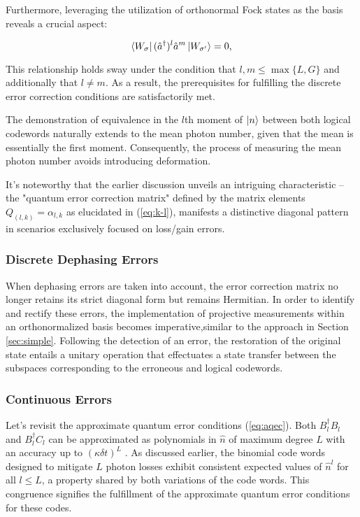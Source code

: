 \documentclass[11pt]{article}
\newcommand\0{\mathbf{0}}
\newcommand\<{\langle}
\renewcommand\>{\rangle}
\begin{document}
Furthermore, leveraging the utilization of orthonormal Fock states as the basis reveals a crucial aspect:

\[
\bra{W_\sigma}(\hat{a}^\dag)^l\hat{a}^m \ket{W_{\sigma'}} = 0,
\]

This relationship holds sway under the condition that \(l, m \leq \max\{L, G\}\) and additionally that \(l \neq m\). As a result, the prerequisites for fulfilling the discrete error correction conditions are satisfactorily met.

The demonstration of equivalence in the \(l\)th moment of \(\ket{n}\) between both logical codewords naturally extends to the mean photon number, given that the mean is essentially the first moment. Consequently, the process of measuring the mean photon number avoids introducing deformation.

It's noteworthy that the earlier discussion unveils an intriguing characteristic – the "quantum error correction matrix" defined by the matrix elements \(Q_{(l, k)} = \alpha_{l, k}\) as elucidated in (\ref{eq:k-l}), manifests a distinctive diagonal pattern in scenarios exclusively focused on loss/gain errors.


\subsubsection{Discrete Dephasing Errors}

When dephasing errors are taken into account, the error correction matrix no longer retains its strict diagonal form but remains Hermitian. In order to identify and rectify these errors, the implementation of projective measurements within an orthonormalized basis becomes imperative,similar to the approach in Section \ref{sec:simple}. Following the detection of an error, the restoration of the original state entails a unitary operation that effectuates a state transfer between the subspaces corresponding to the erroneous and logical codewords.

\subsubsection{Continuous Errors}
\label{sec:cat-cont}

Let's revisit the approximate quantum error conditions (\ref{eq:aqec}). Both $B_l^\dag B_l$ and $B_l^\dag C_l$ can be approximated as polynomials in $\hat{n}$ of maximum degree $L$ with an accuracy up to $(\kappa \delta t)^L$ \cite{michael2016new}. As discussed earlier, the binomial code words designed to mitigate $L$ photon losses exhibit consistent expected values of $\hat{n}^l$ for all $l \leq L$, a property shared by both variations of the code words. This congruence signifies the fulfillment of the approximate quantum error conditions for these codes.
\end{document}
